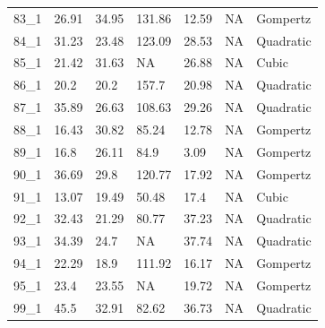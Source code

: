 \documentclass[titlepage]{article}
\begin{document}
\begin{longtable}{lllllll}
83\_1 & 26.91 & 34.95 & 131.86 & 12.59 & NA & Gompertz \\
84\_1 & 31.23 & 23.48 & 123.09 & 28.53 & NA & Quadratic \\
85\_1 & 21.42 & 31.63 & NA & 26.88 & NA & Cubic \\
86\_1 & 20.2 & 20.2 & 157.7 & 20.98 & NA & Quadratic \\
87\_1 & 35.89 & 26.63 & 108.63 & 29.26 & NA & Quadratic \\
88\_1 & 16.43 & 30.82 & 85.24 & 12.78 & NA & Gompertz \\
89\_1 & 16.8 & 26.11 & 84.9 & 3.09 & NA & Gompertz \\
90\_1 & 36.69 & 29.8 & 120.77 & 17.92 & NA & Gompertz \\
91\_1 & 13.07 & 19.49 & 50.48 & 17.4 & NA & Cubic \\
92\_1 & 32.43 & 21.29 & 80.77 & 37.23 & NA & Quadratic \\
93\_1 & 34.39 & 24.7 & NA & 37.74 & NA & Quadratic \\
94\_1 & 22.29 & 18.9 & 111.92 & 16.17 & NA & Gompertz \\
95\_1 & 23.4 & 23.55 & NA & 19.72 & NA & Gompertz \\
99\_1 & 45.5 & 32.91 & 82.62 & 36.73 & NA & Quadratic
\end{longtable}

   
\end{document}
